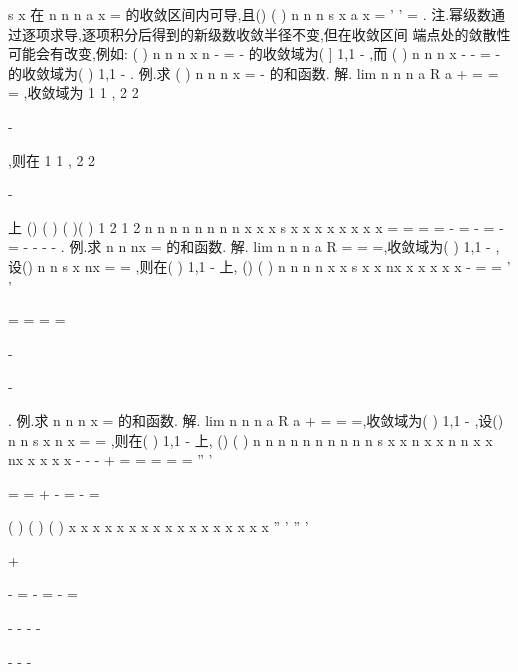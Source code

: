 s x 在
n
n
n
a x
\infty 
=\sum 
的收敛区间内可导,且()
(
)
n
n
n
s x
a x
\infty 
=
'
'
=\sum 
. 
\textcolor{lyred}{注}.幂级数通过逐项求导,逐项积分后得到的新级数收敛半径不变,但在收敛区间 
端点处的敛散性可能会有改变,例如: 
(
)
n
n
n
x
n
-
\infty 
=
-
\sum 
的收敛域为(
]
1,1
-
,而
(
)
n
n
n
x
\infty 
-
-
=
-
\sum 
的收敛域为(
)
1,1
-
. 
\textcolor{lyred}{例}.求
(
)
n
n
n
x
\infty 
=
-
\sum 
的和函数. 
解.
lim
n
n
n
a
R
a
\rho 
+
\to \infty 
=
=
\Rightarrow 
=
,收敛域为
1 1
,
2 2


-




,则在
1 1
,
2 2


-




上 
()
(
)
(
)(
)
1 2
1 2
n
n
n
n
n
n
n
n
x
x
x
s x
x
x
x
x
x
x
x
\infty 
\infty 
\infty 
=
=
=
=
-
=
-
=
-
=
-
-
-
-
\sum 
\sum 
\sum 
. 
\textcolor{lyred}{例}.求
n
n
nx
\infty 
=\sum 
的和函数. 
解.
lim
n
n
n
a
R
\rho 
\to \infty 
=
=\Rightarrow 
=,收敛域为(
)
1,1
-
,设()
n
n
s x
nx
\infty 
=
=\sum 
,则在(
)
1,1
-
上, 
()
(
)
n
n
n
n
x
x
s x
x
nx
x
x
x
x
x
\infty 
\infty 
-
=
=
'
'




=
=
=
=




-


-


\sum 
\sum 
. 
\textcolor{lyred}{例}.求
n
n
n x
\infty 
=\sum 
的和函数. 
解.
lim
n
n
n
a
R
a
\rho 
+
\to \infty 
=
=\Rightarrow 
=,收敛域为(
)
1,1
-
,设()
n
n
s x
n x
\infty 
=
=\sum 
,则在(
)
1,1
-
上, 
()
(
)
n
n
n
n
n
n
n
n
n
n
s x
x
n x
x
n n
x
x
nx
x
x
x
x
\infty 
\infty 
\infty 
\infty 
\infty 
-
-
-
+
=
=
=
=
=
''
'




=
=
+
-
=
-
=








\sum 
\sum 
\sum 
\sum 
\sum 
(
)
(
)
(
)
x
x
x
x
x
x
x
x
x
x
x
x
x
x
x
x
x
''
'
''
'


+






-
=
-
=
-
=








-
-
-
-






-
-
-


